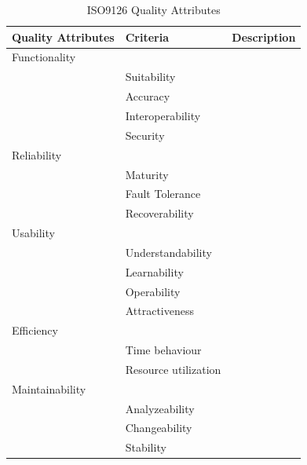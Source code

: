 \begin{table}[ht!]
	\centering
	\caption{ISO9126 Quality Attributes}
	\label{tab:qaAttributes}
    \begin{tabular}{|l|l|l|}
    Quality Attributes & Criteria             & Description \\ \hline 
    Functionality      & ~                    & ~           \\ \hline
    ~                  & Suitability          & ~           \\ \hline
    ~                  & Accuracy             & ~           \\ \hline
    ~                  & Interoperability     & ~           \\ \hline
    ~                  & Security             & ~           \\ \hline
    Reliability        & ~                    & ~           \\ \hline
    ~                  & Maturity             & ~           \\ \hline
    ~                  & Fault Tolerance      & ~           \\ \hline
    ~                  & Recoverability       & ~           \\ \hline
    Usability          & ~                    & ~           \\ \hline
    ~                  & Understandability    & ~           \\ \hline
    ~                  & Learnability         & ~           \\ \hline
    ~                  & Operability          & ~           \\ \hline
    ~                  & Attractiveness       & ~           \\ \hline
    Efficiency         & ~                    & ~           \\ \hline
    ~                  & Time behaviour       & ~           \\ \hline
    ~                  & Resource utilization & ~           \\ \hline
    Maintainability    & ~                    & ~           \\ \hline
    ~                  & Analyzeability       & ~           \\ \hline
    ~                  & Changeability        & ~           \\ \hline
    ~                  & Stability            & ~           \\ \hline

\end{tabular}
\end{table}
